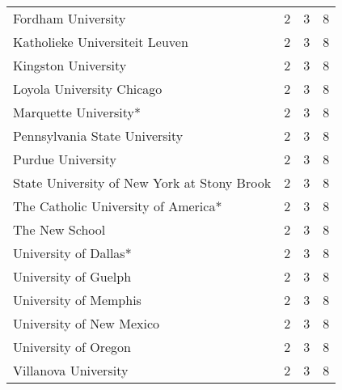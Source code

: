 \begin{longtable}[t]{llll}
Fordham University & 2 & 3 & 8\\
Katholieke Universiteit Leuven & 2 & 3 & 8\\
\addlinespace
Kingston University & 2 & 3 & 8\\
Loyola University Chicago & 2 & 3 & 8\\
Marquette University* & 2 & 3 & 8\\
Pennsylvania State University & 2 & 3 & 8\\
Purdue University & 2 & 3 & 8\\
\addlinespace
State University of New York at Stony Brook & 2 & 3 & 8\\
The Catholic University of America* & 2 & 3 & 8\\
The New School & 2 & 3 & 8\\
University of Dallas* & 2 & 3 & 8\\
University of Guelph & 2 & 3 & 8\\
\addlinespace
University of Memphis & 2 & 3 & 8\\
University of New Mexico & 2 & 3 & 8\\
University of Oregon & 2 & 3 & 8\\
Villanova University & 2 & 3 & 8\\
\bottomrule
\end{longtable}